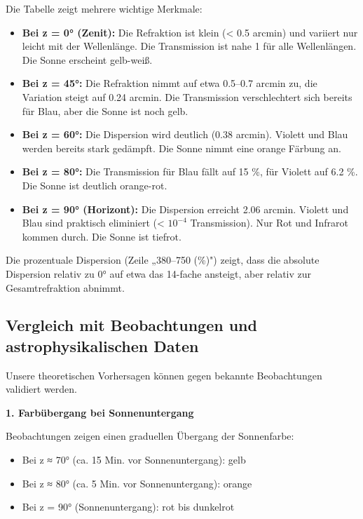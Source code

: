 \documentclass[12pt,a4paper]{article}
\begin{document}
Die Tabelle zeigt mehrere wichtige Merkmale:

\begin{itemize}
	\item \textbf{Bei z = 0° (Zenit):} Die Refraktion ist klein (< 0.5 arcmin)
	und variiert nur leicht mit der Wellenlänge. Die Transmission ist
	nahe 1 für alle Wellenlängen. Die Sonne erscheint gelb-weiß.
	
	\item \textbf{Bei z = 45°:} Die Refraktion nimmt auf etwa 0.5–0.7 arcmin zu,
	die Variation steigt auf 0.24 arcmin. Die Transmission verschlechtert sich
	bereits für Blau, aber die Sonne ist noch gelb.
	
	\item \textbf{Bei z = 60°:} Die Dispersion wird deutlich (0.38 arcmin).
	Violett und Blau werden bereits stark gedämpft. Die Sonne nimmt
	eine orange Färbung an.
	
	\item \textbf{Bei z = 80°:} Die Transmission für Blau fällt auf 15 \%,
	für Violett auf 6.2 \%. Die Sonne ist deutlich orange-rot.
	
	\item \textbf{Bei z = 90° (Horizont):} Die Dispersion erreicht 2.06 arcmin.
	Violett und Blau sind praktisch eliminiert (< $10^{-4}$ Transmission).
	Nur Rot und Infrarot kommen durch. Die Sonne ist tiefrot.
\end{itemize}

Die prozentuale Dispersion (Zeile „380–750 (\%)") zeigt, dass die absolute
Dispersion relativ zu 0° auf etwa das 14-fache ansteigt, aber relativ zur
Gesamtrefraktion abnimmt.

\subsection{Vergleich mit Beobachtungen und astrophysikalischen Daten}
\label{subsec:vergleich_beobachtung}

Unsere theoretischen Vorhersagen können gegen bekannte Beobachtungen validiert werden.

\textbf{1. Farbübergang bei Sonnenuntergang}

Beobachtungen zeigen einen graduellen Übergang der Sonnenfarbe:
\begin{itemize}
	\item Bei z ≈ 70° (ca. 15 Min. vor Sonnenuntergang): gelb
	\item Bei z ≈ 80° (ca. 5 Min. vor Sonnenuntergang): orange
	\item Bei z = 90° (Sonnenuntergang): rot bis dunkelrot
\end{itemize}
\end{document}
